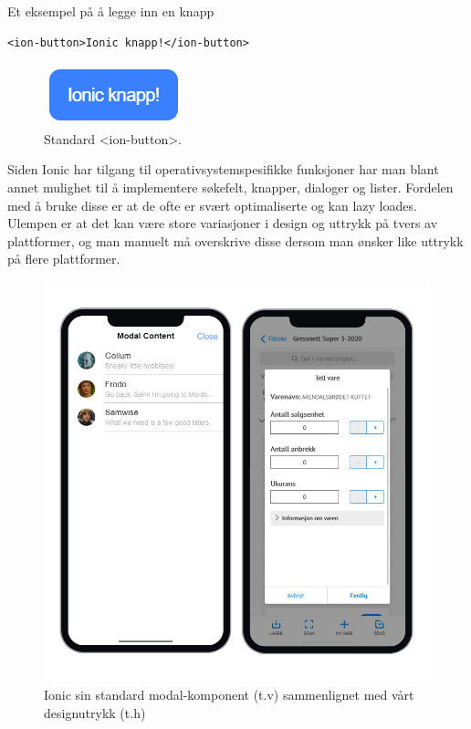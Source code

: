 Et eksempel på å legge inn en knapp
\begin{lstlisting}
<ion-button>Ionic knapp!</ion-button>
\end{lstlisting}

\begin{figure}[H]
    \centering
    \includegraphics{figures/Tekniske-valg/ionicButtonExample.PNG}
    \caption{Standard <ion-button>.}
    \label{fig:my_label}
\end{figure}

Siden Ionic har tilgang til operativsystemspesifikke funksjoner har man blant annet mulighet til å implementere søkefelt, knapper, dialoger og lister. Fordelen med å bruke disse er at de ofte er svært optimaliserte og kan lazy loades. Ulempen er at det kan være store variasjoner i design og uttrykk på tvers av plattformer, og man manuelt må overskrive disse dersom man ønsker like uttrykk på flere plattformer.

\begin{figure}[H] 
    \centering
    \includegraphics[width=\textwidth]{figures/Tekniske-valg/Ionic/modal.jpg}
    \caption{Ionic sin standard modal-komponent (t.v) sammenlignet med vårt designutrykk (t.h)}
    \label{modalComparison}
\end{figure}


